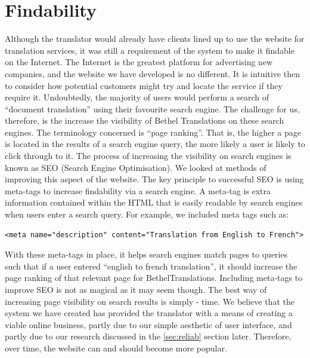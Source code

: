 \documentclass{l3proj}
\begin{document}
\section{Findability}
Although the translator would already have clients lined up to use the website for translation 
services, it was still a requirement of the system to make it findable on the Internet. The Internet
is the greatest platform for advertising new companies, and the website we have developed is no different.
It is intuitive then to consider how potential customers might try and locate the service if they require it.
Undoubtedly, the majority of users would perform a search of ``document translation'' using their favourite
search engine. The challenge for us, therefore, is the increase the visibility of Bethel Translations on
these search engines. The terminology concerned is ``page ranking''. That is, the higher a page is located
in the results of a search engine query, the more likely a user is likely to click through to it. \newline
The process of increasing the visibility on search engines is known as SEO (Search Engine Optimisation). We 
looked at methods of improving this aspect of the website.  The key principle to successful SEO is using
meta-tags to increase findability via a search engine. A meta-tag is extra information contained within the HTML
that is easily readable by search engines when users enter a search query. For example, we included meta tags
such as:
\begin{lstlisting}
<meta name="description" content="Translation from English to French">
\end{lstlisting}
With these meta-tags in place, it helps search engines match pages to queries such that if a user entered ``english to
french translation'', it should increase the page ranking of that relevant page for BethelTranslations. Including
meta-tags to improve SEO is not as magical as it may seem though. The best way of increasing page visibility on 
search results is simply - time. We believe that the system we have created has provided the translator with a means
of creating a viable online business, partly due to our simple aesthetic of user interface, and partly due to our
research discussed in the \ref{sec:reliab} section later. Therefore, over time, the website can and should become
more popular.
\end{document}
